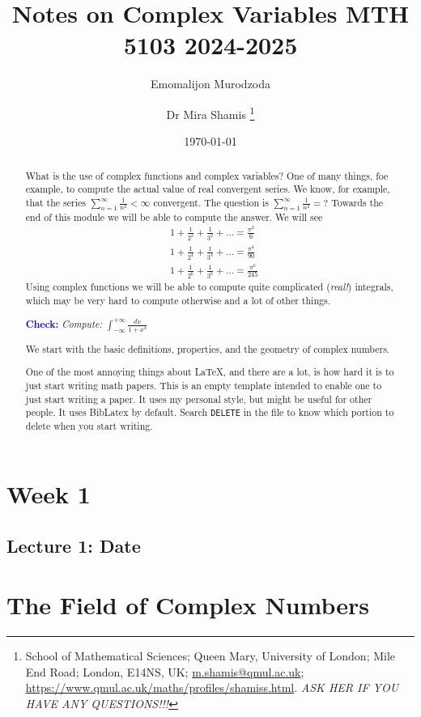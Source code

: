 \documentclass[12pt]{article}
\makeatletter
\newcommand{\checkthis}[1]{\vspace{5pt}
\noindent\textcolor{blue}{\textbf{Check:}} #1\vspace{5pt}}
\newcommand{\week}[1]{\section*{Week #1}}
\newcommand{\lecture}[2]{\subsection*{Lecture #1: #2}}
\newcommand{\MiraThanks}[1]{%
   \thanks{%
      School of Mathematical Sciences; %
      Queen Mary, University of London; %
      Mile End Road; %
      London, E14NS, UK; %
      \href{m.shamis@qmul.ac.uk}{m.shamis@qmul.ac.uk}; %
      \url{https://www.qmul.ac.uk/maths/profiles/shamiss.html}. %
   #1%
   }%
}
\makeatother
\begin{document}
\title{Notes on Complex Variables MTH 5103 2024-2025}

\author{%
   Emomalijon Murodzoda%
   \and%
   Dr Mira Shamis%
   \MiraThanks{\emph{ASK HER IF YOU HAVE ANY QUESTIONS!!!}}
}

\date{\today}

\maketitle
\week{1}
\lecture{1}{Date}
\begin{abstract}
    What is the use of complex functions and complex variables? One of many things, foe example, to compute the actual value of real convergent series. We know, for example, that the series $\sum_{n=1}^\infty\frac 1{n^2}<\infty$ convergent. The question is $\sum_{n=1}^\infty\frac 1{n^2}=?$ 
    Towards the end of this module we will be able to compute the answer. 
    We will see 
    \begin{align*}
        & 1+\frac 1{2^2}+\frac 1{3^2}+\dots = \frac{\pi^2}{6} \\
        & 1+\frac 1{2^4}+\frac 1{3^4}+\dots = \frac{\pi^4}{90} \\
        & 1+\frac 1{2^6}+\frac 1{3^6}+\dots = \frac{\pi^6}{245}
    \end{align*}
    Using complex functions we will be able to compute quite complicated (\emph{real!}) integrals, which may be very hard to compute otherwise and a lot of other things.
    
    \checkthis{\emph{Compute:} $\int_{-\infty}^{+\infty}\frac{dx}{1+x^4}$}

    We start with the basic definitions, properties, and the geometry of complex numbers.
    
    One of the most annoying things about \LaTeX, and there are a lot,
    is how hard it is to just start writing math papers. This is an
    empty template intended to enable one to just start writing a
    paper. It uses my personal style, but might be useful for other people. It uses BibLatex by default. Search \texttt{DELETE} in the file to know which portion to delete when you start writing.
\end{abstract}



\section{The Field of Complex Numbers}
\end{document}

